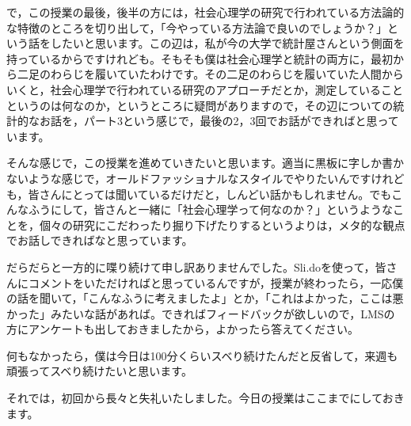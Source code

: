\documentclass{ltjsbook}
\begin{document}
で，この授業の最後，後半の方には，社会心理学の研究で行われている方法論的な特徴のところを切り出して，「今やっている方法論で良いのでしょうか？」という話をしたいと思います。この辺は，私が今の大学で統計屋さんという側面を持っているからですけれども。そもそも僕は社会心理学と統計の両方に，最初から二足のわらじを履いていたわけです。その二足のわらじを履いていた人間からいくと，社会心理学で行われている研究のアプローチだとか，測定していることというのは何なのか，というところに疑問がありますので，その辺についての統計的なお話を，パート3という感じで，最後の2，3回でお話ができればと思っています。

そんな感じで，この授業を進めていきたいと思います。適当に黒板に字しか書かないような感じで，オールドファッショナルなスタイルでやりたいんですけれども，皆さんにとっては聞いているだけだと，しんどい話かもしれません。でもこんなふうにして，皆さんと一緒に「社会心理学って何なのか？」というようなことを，個々の研究にこだわったり掘り下げたりするというよりは，メタ的な観点でお話しできればなと思っています。

だらだらと一方的に喋り続けて申し訳ありませんでした。Sli.doを使って，皆さんにコメントをいただければと思っているんですが，授業が終わったら，一応僕の話を聞いて，「こんなふうに考えましたよ」とか，「これはよかった，ここは悪かった」みたいな話があれば。できればフィードバックが欲しいので，LMSの方にアンケートも出しておきましたから，よかったら答えてください。

何もなかったら，僕は今日は100分くらいスベり続けたんだと反省して，来週も頑張ってスベり続けたいと思います。

それでは，初回から長々と失礼いたしました。今日の授業はここまでにしておきます。
\end{document}

